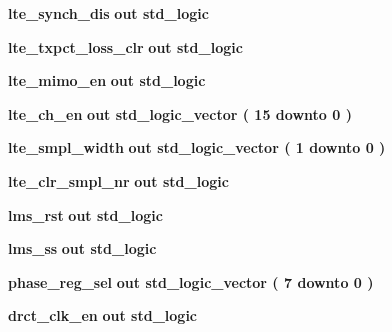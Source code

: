 \begin{DoxyCompactItemize}
\item 
{\bf lte\+\_\+synch\+\_\+dis}  {\bfseries {\bfseries \textcolor{keywordflow}{out}\textcolor{vhdlchar}{ }}} {\bfseries \textcolor{comment}{std\+\_\+logic}\textcolor{vhdlchar}{ }} 
\item 
{\bf lte\+\_\+txpct\+\_\+loss\+\_\+clr}  {\bfseries {\bfseries \textcolor{keywordflow}{out}\textcolor{vhdlchar}{ }}} {\bfseries \textcolor{comment}{std\+\_\+logic}\textcolor{vhdlchar}{ }} 
\item 
{\bf lte\+\_\+mimo\+\_\+en}  {\bfseries {\bfseries \textcolor{keywordflow}{out}\textcolor{vhdlchar}{ }}} {\bfseries \textcolor{comment}{std\+\_\+logic}\textcolor{vhdlchar}{ }} 
\item 
{\bf lte\+\_\+ch\+\_\+en}  {\bfseries {\bfseries \textcolor{keywordflow}{out}\textcolor{vhdlchar}{ }}} {\bfseries \textcolor{comment}{std\+\_\+logic\+\_\+vector}\textcolor{vhdlchar}{ }\textcolor{vhdlchar}{(}\textcolor{vhdlchar}{ }\textcolor{vhdlchar}{ } \textcolor{vhdldigit}{15} \textcolor{vhdlchar}{ }\textcolor{keywordflow}{downto}\textcolor{vhdlchar}{ }\textcolor{vhdlchar}{ } \textcolor{vhdldigit}{0} \textcolor{vhdlchar}{ }\textcolor{vhdlchar}{)}\textcolor{vhdlchar}{ }} 
\item 
{\bf lte\+\_\+smpl\+\_\+width}  {\bfseries {\bfseries \textcolor{keywordflow}{out}\textcolor{vhdlchar}{ }}} {\bfseries \textcolor{comment}{std\+\_\+logic\+\_\+vector}\textcolor{vhdlchar}{ }\textcolor{vhdlchar}{(}\textcolor{vhdlchar}{ }\textcolor{vhdlchar}{ } \textcolor{vhdldigit}{1} \textcolor{vhdlchar}{ }\textcolor{keywordflow}{downto}\textcolor{vhdlchar}{ }\textcolor{vhdlchar}{ } \textcolor{vhdldigit}{0} \textcolor{vhdlchar}{ }\textcolor{vhdlchar}{)}\textcolor{vhdlchar}{ }} 
\item 
{\bf lte\+\_\+clr\+\_\+smpl\+\_\+nr}  {\bfseries {\bfseries \textcolor{keywordflow}{out}\textcolor{vhdlchar}{ }}} {\bfseries \textcolor{comment}{std\+\_\+logic}\textcolor{vhdlchar}{ }} 
\item 
{\bf lms\+\_\+rst}  {\bfseries {\bfseries \textcolor{keywordflow}{out}\textcolor{vhdlchar}{ }}} {\bfseries \textcolor{comment}{std\+\_\+logic}\textcolor{vhdlchar}{ }} 
\item 
{\bf lms\+\_\+ss}  {\bfseries {\bfseries \textcolor{keywordflow}{out}\textcolor{vhdlchar}{ }}} {\bfseries \textcolor{comment}{std\+\_\+logic}\textcolor{vhdlchar}{ }} 
\item 
{\bf phase\+\_\+reg\+\_\+sel}  {\bfseries {\bfseries \textcolor{keywordflow}{out}\textcolor{vhdlchar}{ }}} {\bfseries \textcolor{comment}{std\+\_\+logic\+\_\+vector}\textcolor{vhdlchar}{ }\textcolor{vhdlchar}{(}\textcolor{vhdlchar}{ }\textcolor{vhdlchar}{ } \textcolor{vhdldigit}{7} \textcolor{vhdlchar}{ }\textcolor{keywordflow}{downto}\textcolor{vhdlchar}{ }\textcolor{vhdlchar}{ } \textcolor{vhdldigit}{0} \textcolor{vhdlchar}{ }\textcolor{vhdlchar}{)}\textcolor{vhdlchar}{ }} 
\item 
{\bf drct\+\_\+clk\+\_\+en}  {\bfseries {\bfseries \textcolor{keywordflow}{out}\textcolor{vhdlchar}{ }}} {\bfseries \textcolor{comment}{std\+\_\+logic}\textcolor{vhdlchar}{ }} 
\end{DoxyCompactItemize}


